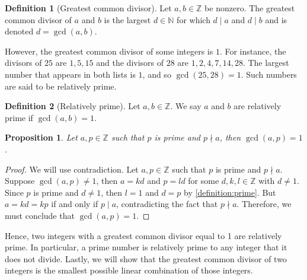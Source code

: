 \documentclass[10pt, titlepage]{amsart}
\newcommand\Z{{\mathbb Z}}
\newcommand\N{{\mathbb N}}
\newtheorem{prop}{Proposition}[subsection]
\theoremstyle{definition}
\newtheorem{definition}{Definition}[subsection]
\newtheorem{example}{Example}[subsection]
\begin{document}
	\begin{definition}[Greatest common divisor]\label{definition:gcd}
		Let $a,b \in \Z$ be nonzero. The greatest common divisor of $a$ and $b$ is the largest $d \in \N$ for which $d \mid a$ and $d \mid b$ and is denoted $d = \gcd(a,b)$.
	\end{definition}		

	
	However, the greatest common divisor of some integers is $1$. For instance, the divisors of $25$ are $1,5,15$ and the divisors of $28$ are $1,2,4,7,14,28$. The largest number that appears in both lists is $1$, and so $\gcd(25, 28) = 1$. Such numbers are said to be relatively prime.
	
	\begin{definition}[Relatively prime]\label{definition:relatively_prime}
		Let $a, b \in \Z$. We say $a$ and $b$ are relatively prime if $\gcd(a,b)=1$. 
	\end{definition}
	
	\begin{prop}\label{prop:gcd_is_1}
		Let $a, p \in \Z$ such that $p$ is prime and $p \nmid a$, then $\gcd(a,p) = 1$.
	\end{prop}
	
	\begin{proof}
		We will use contradiction. 
		Let $a, p \in \Z$ such that $p$ is prime and $p \nmid a$. 
		Suppose $\gcd(a,p) \neq 1$, then $a = kd$ and $p = ld$ for some $d,k,l \in \Z$ with $d \neq 1$.
		Since $p$ is prime and $d \neq 1$, then $l=1$ and $d=p$ by \cref{definition:prime}.
		But $a=kd=kp$ if and only if $p \mid a$, contradicting the fact that $p \nmid a$.
		Therefore, we must conclude that $\gcd(a,p) = 1$.
	\end{proof}
	

	Hence, two integers with a greatest common divisor equal to 1 are relatively prime. In particular, a prime number is relatively prime to any integer that it does not divide. Lastly, we will show that the greatest common divisor of two integers is the smallest possible linear combination of those integers.
				
\end{document}
